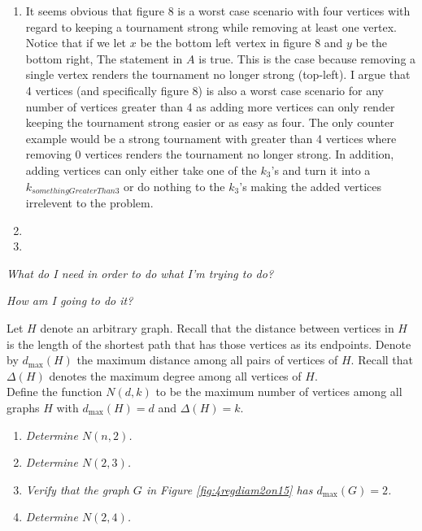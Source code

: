 \documentclass[12pt]{article}
\newenvironment{sub}[2][Sub-Experience]{\begin{trivlist}
\item[\hskip \labelsep {\bfseries #1}\hskip \labelsep {\bfseries #2.}]}{\end{trivlist}}
\begin{document}
\begin{enumerate}
\item[(A)] It seems obvious that figure 8 is a worst case scenario with four vertices with regard to keeping a tournament strong while removing at least one vertex. Notice that if we let $x$ be the bottom left vertex in figure 8 and $y$ be the bottom right, The statement in $A$ is true. This is the case because removing a single vertex renders the tournament no longer strong (top-left). I argue that 4 vertices (and specifically figure 8) is also a worst case scenario for any number of vertices greater than 4 as adding more vertices can only render keeping the tournament strong easier or as easy as four. The only counter example would be a strong tournament with greater than 4 vertices where removing 0 vertices renders the tournament no longer strong.  In addition, adding vertices can only either take one of the $k_3$'s and turn it into a $k_{somethingGreaterThan3}$ or do nothing to the $k_3$'s making the added vertices irrelevent to the problem. 
\item[(B-1)]
\item[(B-2)]
\end{enumerate}



\textit{What do I need in order to do what I'm trying to do?}\newline
 
\textit{How am I going to do it?}\newline

\begin{sub}{5. An Optimization Problem}

\end{sub}


\noindent Let $H$ denote an arbitrary graph.  Recall that the distance between vertices in $H$ is the length of the shortest path 
that has those vertices as its endpoints.  Denote by $d_{\mathrm{max}}(H)$ the maximum distance among all pairs of vertices of $H$.  
Recall that $\Delta(H)$ denotes the maximum degree among all vertices of $H$.\\


\noindent Define the function $N(d,k)$ to be the maximum number of vertices among all graphs $H$ with $d_{\mathrm{max}}(H) = d$ and $\Delta(H) = k$.\\

\begin{enumerate}
\item[One.] \emph{Determine $N(n,2)$.}

\item[Two.] \emph{Determine $N(2,3)$.}

\item[Three.] \emph{Verify that the graph $G$ in Figure \ref{fig:4regdiam2on15} has $d_{\mathrm{max}}(G) =2$.}

\item[Four.] \emph{Determine $N(2,4)$.}
\end{enumerate}
\end{document}
